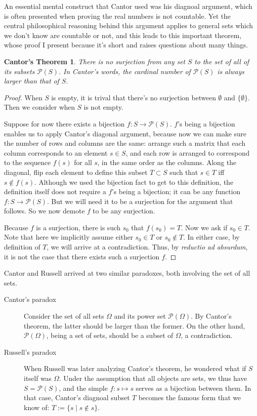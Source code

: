 \documentclass[10pt]{article}
\newtheorem*{CT}{Cantor's Theorem}
\begin{document}
An essential mental construct that Cantor used was his diagnoal argument, which
is often presented when proving the real numbers is not countable. Yet the
central philosophical reasoning behind this argument applies to general sets
which we don't know are countable or not, and this leads to this important
theorem, whose proof I present because it's short and raises questions about
many things.
\begin{CT}
There is no surjection from any set $S$ to the set of all of its subsets
$\mathcal{P}(S)$. In Cantor's words, the cardinal number of $\mathcal{P}(S)$ is
always larger than that of $S$.
\end{CT}
\begin{proof}
When $S$ is empty, it is trival that there's no surjection between $\emptyset$
and $\{\emptyset\}$. Then we consider when $S$ is not empty.

Suppose for now there exists a bijection $f : S \to
\mathcal{P}(S)$. $f$'s being a bijection enables us to apply Cantor's
diagonal argument, because now we can make sure the number of rows and columns
are the same: arrange such a matrix that each column corresponds to an element
$s \in S$, and each row is arranged to correspond to the sequence $f(s)$ for
all $s$, in the same order as the columns. Along the diagonal, flip each
element to define this subset $T \subset S$ such that $s \in T$ iff $s \notin
f(s)$. Although we used the bijection fact to get to this definition, the
definition itself does not require a $f$'s being a bijection; it can be any
function $f : S \to \mathcal{P}(S)$. But we will need it to be a surjection for
the argument that follows. So we now demote $f$ to be any surjection.

Because $f$ is a surjection, there is such $s_0$ that $f(s_0) = T$. Now we ask
if $s_0 \in T$. Note that here we implicitly assume either $s_0 \in T$ or $s_0
\notin T$. In either case, by definition of $T$, we will arrive at a
contradiction. Thus, by \emph{reductio ad absurdum}, it is not the case
that there exists such a surjection $f$.
\end{proof}

Cantor and Russell arrived at two similar paradoxes, both involving the set of
all sets.
\begin{description}
	\item[Cantor's paradox] Consider the set of all sets $\Omega$ and its
		power set $\mathcal{P}(\Omega)$. By Cantor's theorem, the latter should
		be larger than the former. On the other hand, $\mathcal{P}(\Omega)$,
		being a set of sets, should be a subset of $\Omega$, a contradiction.
	\item [Russell's paradox] When Russell was later analyzing Cantor's
		theorem, he wondered what if $S$ itself was $\Omega$. Under the
		assumption that all objects are sets, we thus have $S =
		\mathcal{P}(S)$, and the simple $f: s \mapsto s$ serves as a bijection
		between them. In that case, Cantor's diagnoal subset $T$ becomes the
		famous form that we know of: $T := \{s \mid s \notin s \}$.
\end{description}
\end{document}
